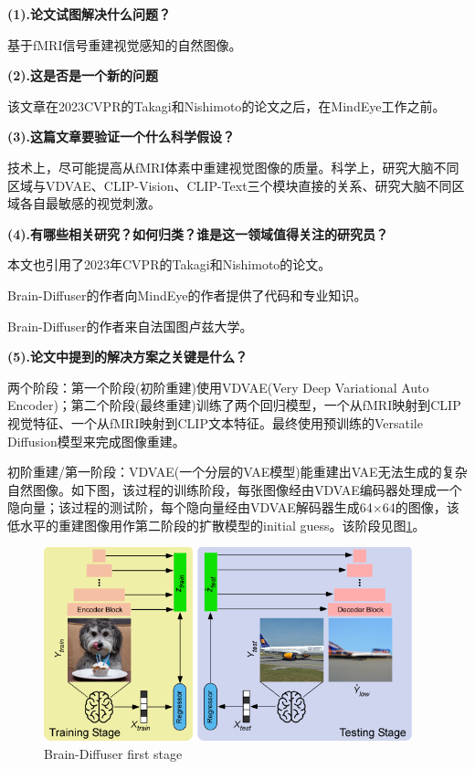 \documentclass[12pt, a4paper, oneside]{ctexart}
\begin{document}
    \noindent\textbf{(1).论文试图解决什么问题？}

    基于fMRI信号重建视觉感知的自然图像。

    \noindent\textbf{(2).这是否是一个新的问题}

    该文章在2023CVPR的Takagi和Nishimoto\cite{takagi2023high}的论文之后，在MindEye\cite{Scotti2023ReconstructingTM}工作之前。

    \noindent\textbf{(3).这篇文章要验证一个什么科学假设？}

    技术上，尽可能提高从fMRI体素中重建视觉图像的质量。科学上，研究大脑不同区域与VDVAE、CLIP-Vision、CLIP-Text三个模块直接的关系、研究大脑不同区域各自最敏感的视觉刺激。

    \noindent\textbf{(4).有哪些相关研究？如何归类？谁是这一领域值得关注的研究员？}

    本文也引用了2023年CVPR的Takagi和Nishimoto的论文。

    Brain-Diffuser的作者向MindEye的作者提供了代码和专业知识。

    Brain-Diffuser的作者来自法国图卢兹大学。

    \noindent\textbf{(5).论文中提到的解决方案之关键是什么？}

    两个阶段：第一个阶段(初阶重建)使用VDVAE(Very Deep Variational Auto Encoder)；第二个阶段(最终重建)训练了两个回归模型，一个从fMRI映射到CLIP视觉特征、一个从fMRI映射到CLIP文本特征。最终使用预训练的Versatile Diffusion模型来完成图像重建。

    初阶重建/第一阶段：VDVAE(一个分层的VAE模型)能重建出VAE无法生成的复杂自然图像。如下图，该过程的训练阶段，每张图像经由VDVAE编码器处理成一个隐向量；该过程的测试阶，每个隐向量经由VDVAE解码器生成64×64的图像，该低水平的重建图像用作第二阶段的扩散模型的initial guess。该阶段见图\ref{brain-diffuser first stage}。

    \begin{figure}[htbp]
        \centering
        \includegraphics[width=0.95\textwidth]{pic/4.4_first stage.png}
        \caption{Brain-Diffuser first stage}
        \label{brain-diffuser first stage}
    \end{figure}
\end{document}
